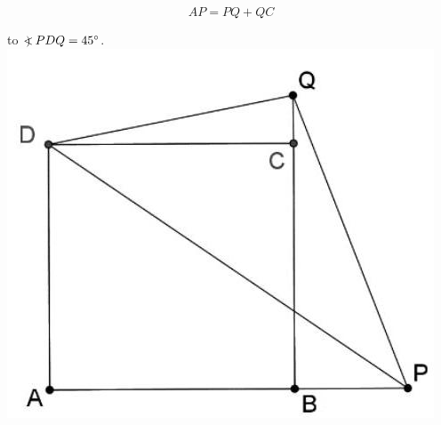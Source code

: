 \documentclass[10pt]{article}
\newcommand\Varangle{\mathop{{<\!\!\!\!\!\text{\small)}}\:}\nolimits}
\begin{document}
\[
A P=P Q+Q C
\]

to \(\Varangle P D Q=45^{\circ}\).\\
\includegraphics[max width=\textwidth, center]{2024_11_21_15d8c8dfe5a0f4f689ffg-1(1)}
\end{document}
